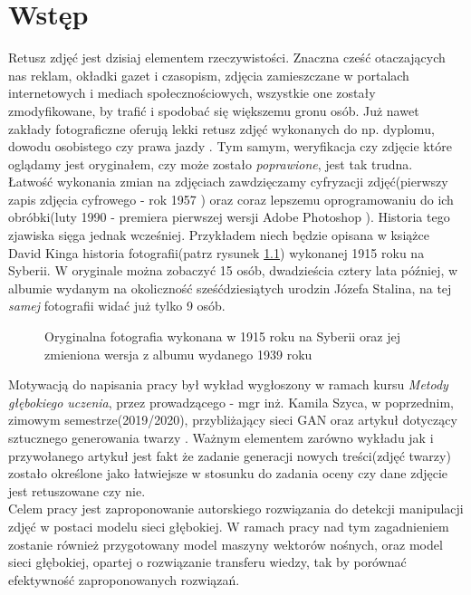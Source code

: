 \chapter{Wstęp}

Retusz zdjęć jest dzisiaj elementem rzeczywistości. Znaczna cześć otaczających nas reklam, okładki gazet i czasopism, zdjęcia zamieszczane w portalach internetowych i mediach społecznościowych, wszystkie one zostały zmodyfikowane, by trafić i spodobać się większemu gronu osób. Już nawet zakłady fotograficzne oferują lekki retusz zdjęć wykonanych do np. dyplomu, dowodu osobistego czy prawa jazdy \cite{retusz}. Tym samym, weryfikacja czy zdjęcie które oglądamy jest oryginałem, czy może zostało \textit{poprawione}, jest tak trudna. \\

Łatwość wykonania zmian na zdjęciach zawdzięczamy cyfryzacji zdjęć(pierwszy zapis zdjęcia cyfrowego - rok 1957 \cite{hist}) oraz coraz lepszemu oprogramowaniu do ich obróbki(luty 1990 - premiera pierwszej wersji Adobe Photoshop \cite{hist}). Historia tego zjawiska sięga jednak wcześniej. Przykładem niech będzie opisana w książce David Kinga \cite{stl} historia fotografii(patrz rysunek \ref{fig:stalin}) wykonanej 1915 roku na Syberii. W oryginale można zobaczyć 15 osób, dwadzieścia cztery lata później, w albumie wydanym na okoliczność sześćdziesiątych urodzin Józefa Stalina, na tej \textit{samej} fotografii widać już tylko 9 osób.
\begin{figure}[h!]
	\centering
	\qquad
	\caption{Oryginalna fotografia wykonana w 1915 roku na Syberii oraz jej zmieniona wersja z albumu wydanego 1939 roku}
	\label{fig:stalin}
\end{figure}

Motywacją do napisania pracy był wykład wygłoszony w ramach kursu \textit{Metody głębokiego uczenia}, przez prowadzącego - mgr inż. Kamila Szyca, w poprzednim, zimowym semestrze(2019/2020), przybliżający sieci GAN oraz artykuł dotyczący sztucznego generowania twarzy \cite{gan}. Ważnym elementem zarówno wykładu jak i przywołanego artykuł jest fakt że zadanie generacji nowych treści(zdjęć twarzy) zostało określone jako łatwiejsze w stosunku do zadania oceny czy dane zdjęcie jest retuszowane czy nie. \\

Celem pracy jest zaproponowanie autorskiego rozwiązania do detekcji manipulacji zdjęć w postaci modelu sieci głębokiej. W ramach pracy nad tym zagadnieniem zostanie również przygotowany model maszyny wektorów nośnych, oraz model sieci głębokiej, opartej o rozwiązanie transferu wiedzy, tak by porównać efektywność zaproponowanych rozwiązań. \\

